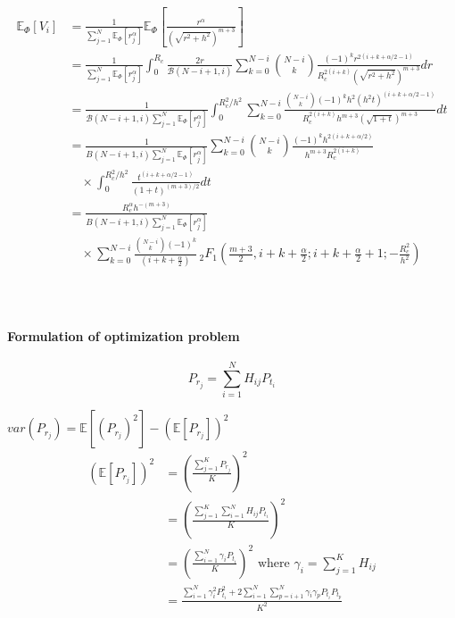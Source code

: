 \documentclass[slidestop,usepdftitle=false]{gvvslides}
\providecommand{\sbrak}[1]{\ensuremath{{}\left[#1\right]}}
\providecommand{\brak}[1]{\ensuremath{\left(#1\right)}}
\begin{document}
   \begin{frame}
   \footnotesize{
\begin{align}
   \mathbb{E}_{\Phi}\sbrak{V_i}&=\frac{1}{\sum_{j=1}^N\mathbb{E}_{\Phi}\sbrak{r_j^{\alpha}} }\mathbb{E}_{\Phi}\sbrak{\frac{r^{\alpha}}{\brak{\sqrt{r^2+h^2}}^{m+3}}} \nonumber \\
   &=\frac{1}{\sum_{j=1}^N\mathbb{E}_{\Phi}\sbrak{r_j^{\alpha}} } \int_{0}^{R_c}\frac{2r}{\mathcal{B}\brak{N-i+1,i}} \sum_{k=0}^{N-i}\binom{N-i}{k}\frac{(-1)^{k}r^{2(i+k+\alpha/2-1)}}{R_c^{2(i+k)}\brak{\sqrt{r^2+h^2}}^{m+3}}dr \nonumber \\
    &=\frac{1}{\mathcal{B}\brak{N-i+1,i}\sum_{j=1}^N\mathbb{E}_{\Phi}\sbrak{r_j^{\alpha}} }  \int_{0}^{R_c^2/h^2} \sum_{k=0}^{N-i}\frac{\binom{N-i}{k}(-1)^{k}h^{2}\brak{h^2t}^{(i+k+\alpha/2-1)}}{R_c^{2(i+k)}h^{m+3}\brak{\sqrt{1+t}}^{m+3}}dt \nonumber \\
    &=\frac{1}{B\brak{N-i+1,i}\sum_{j=1}^N\mathbb{E}_{\Phi}\sbrak{r_j^{\alpha}} } \sum_{k=0}^{N-i}\binom{N-i}{k}\frac{(-1)^{k}h^{2(i+k+\alpha/2)}}{h^{m+3}R_c^{2(i+k)}}
    \nonumber \\
    & \quad \times \int_{0}^{R_c^2/h^2} \!\!\!\!\frac{t^{(i+k+\alpha/2-1)}}{\brak{1+t}^{\brak{m+3}/2}}dt \nonumber \\
     &=\frac{R_c^{\alpha}h^{-(m+3)}}{B\brak{N-i+1,i}\sum_{j=1}^N\mathbb{E}_{\Phi}\sbrak{r_j^{\alpha}}} \nonumber \\
     &\quad \times \sum_{k=0}^{N-i}\frac{\binom{N-i}{k}(-1)^{k}}{\brak{i+k+\frac{\alpha}{2}}}   \, _2F_1\brak{\frac{m+3}{2},i+k+\frac{\alpha}{2};i+k+\frac{\alpha}{2}+1;-\frac{R_c^2}{h^2}}
   \end{align}
}
\end{frame}
\begin{frame}
\frametitle{\,}
\framesubtitle{Formulation of optimization problem}
\begin{equation}
P_{r_j}=\sum_{i=1}^NH_{ij}P_{t_i}
\end{equation}

$var(P_{r_j})=\mathbb{E}\sbrak{\brak{P_{r_j}}^2}-\brak{\mathbb{E}\sbrak{P_{r_j}}}^2$
\footnotesize{
\begin{align}
\brak{\mathbb{E}\sbrak{P_{r_j}}}^2&=\brak{\frac{\sum_{j=1}^KP_{r_j}}{K}}^2\\ \nonumber
&=\brak{\frac{\sum_{j=1}^K\sum_{i=1}^NH_{ij}P_{t_i}}{K}}^2\\ \nonumber
&=\brak{\frac{\sum_{i=1}^N\gamma_iP_{t_i}}{K}}^2 \text{ where } \gamma_i=\sum_{j=1}^KH_{ij}\\ \nonumber
&=\frac{\sum_{i=1}^N\gamma_i^2P_{t_i}^2+2\sum_{i=1}^N\sum_{p=i+1}^{N}\gamma_i\gamma_pP_{t_i}P_{t_p}}{K^2}
\end{align}
}
\end{frame}
\end{document}
